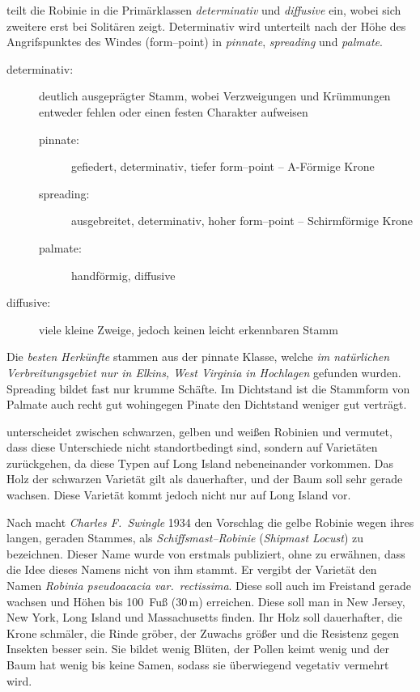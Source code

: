 \documentclass[twocolumn]{scrartcl}
\begin{document}
\citet{hopp1941robinie} teilt die Robinie in die Primärklassen
\emph{determinativ} und \emph{diffusive} ein, wobei sich zweitere erst
bei Solitären zeigt. Determinativ wird unterteilt nach der Höhe des
Angrifspunktes des Windes (form--point) in \emph{pinnate},
\emph{spreading} und \emph{palmate}.
\begin{description}
\item[determinativ:] deutlich ausgeprägter Stamm, wobei Verzweigungen und Krümmungen entweder fehlen oder einen festen Charakter aufweisen
  \begin{description}
    \item[pinnate:] gefiedert, determinativ, tiefer form--point -- A-Förmige Krone
    \item[spreading:] ausgebreitet, determinativ, hoher form--point -- Schirmförmige Krone
    \item[palmate:] handförmig, diffusive
  \end{description}
\item[diffusive:] viele kleine Zweige, jedoch keinen leicht erkennbaren Stamm
\end{description}
Die \emph{besten Herkünfte} stammen aus der pinnate Klasse,
welche \emph{im natürlichen Verbreitungsgebiet nur in Elkins, West Virginia
in Hochlagen} gefunden wurden. Spreading bildet fast nur krumme
Schäfte. Im Dichtstand ist die Stammform von Palmate auch recht gut
wohingegen Pinate den Dichtstand weniger gut verträgt.

\citet{cope1929robinie} unterscheidet zwischen schwarzen, gelben
und weißen Robinien und vermutet, dass diese Unterschiede nicht
standortbedingt sind, sondern auf Varietäten zurückgehen, da diese
Typen auf Long Island nebeneinander vorkommen. Das Holz der schwarzen
Varietät gilt als dauerhafter, und der Baum soll sehr gerade
wachsen. Diese Varietät kommt jedoch nicht nur auf Long Island vor.

Nach \citet{detwiler1937robinie} macht \emph{Charles F.\ Swingle} 1934
den Vorschlag die gelbe Robinie wegen ihres langen, geraden Stammes,
als \emph{Schiffsmast--Robinie} (\emph{Shipmast Locust}) zu
bezeichnen. Dieser Name wurde von \citet{raber1936shipmast} erstmals
publiziert, ohne zu erwähnen, dass die Idee dieses Namens nicht von ihm
stammt. Er vergibt der Varietät den Namen \emph{Robinia pseudoacacia
var.\ rectissima}. Diese soll auch im Freistand gerade wachsen und
Höhen bis 100~Fuß (30\,m) erreichen. Diese soll man in New Jersey, New
York, Long Island und Massachusetts finden. Ihr Holz soll dauerhafter,
die Krone schmäler, die Rinde gröber, der Zuwachs größer und die
Resistenz gegen Insekten besser sein. Sie bildet wenig Blüten, der
Pollen keimt wenig und der Baum hat wenig bis keine Samen, sodass sie
überwiegend vegetativ vermehrt wird.
\end{document}
